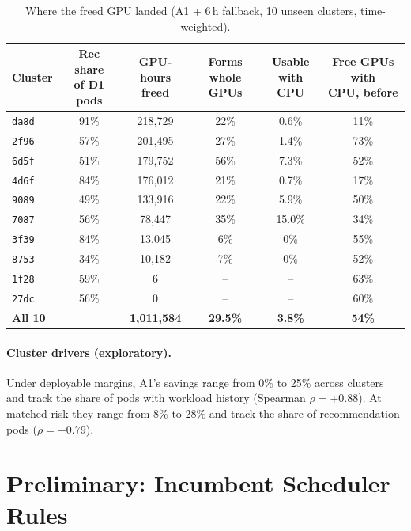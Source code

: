 \documentclass[10pt]{article}
\begin{document}
\begin{table}[H]
\centering\small
\caption{Where the freed GPU landed (A1 + 6\,h fallback, 10 unseen clusters, time-weighted).}
\label{tab:usable}
\begin{tabular}{@{}lccccc@{}}
\toprule
Cluster & \makecell{Rec share\\of D1 pods} & \makecell{GPU-hours\\freed} & \makecell{Forms\\whole GPUs} & \makecell{Usable\\with CPU} & \makecell{Free GPUs with\\CPU, before} \\
\midrule
\texttt{da8d} & 91\% & 218{,}729 & 22\% & 0.6\% & 11\% \\
\texttt{2f96} & 57\% & 201{,}495 & 27\% & 1.4\% & 73\% \\
\texttt{6d5f} & 51\% & 179{,}752 & 56\% & 7.3\% & 52\% \\
\texttt{4d6f} & 84\% & 176{,}012 & 21\% & 0.7\% & 17\% \\
\texttt{9089} & 49\% & 133{,}916 & 22\% & 5.9\% & 50\% \\
\texttt{7087} & 56\% & 78{,}447 & 35\% & 15.0\% & 34\% \\
\texttt{3f39} & 84\% & 13{,}045 & 6\% & 0\% & 55\% \\
\texttt{8753} & 34\% & 10{,}182 & 7\% & 0\% & 52\% \\
\texttt{1f28} & 59\% & 6 & -- & -- & 63\% \\
\texttt{27dc} & 56\% & 0 & -- & -- & 60\% \\
\midrule
\textbf{All 10} & & \textbf{1{,}011{,}584} & \textbf{29.5\%} & \textbf{3.8\%} & \textbf{54\%} \\
\bottomrule
\end{tabular}
\end{table}

\paragraph{Cluster drivers (exploratory).} Under deployable margins, A1's savings range from 0\% to 25\% across clusters and track the share of pods with workload history (Spearman $\rho = +0.88$). At matched risk they range from 8\% to 28\% and track the share of recommendation pods ($\rho = +0.79$).

\section{Preliminary: Incumbent Scheduler Rules}
\label{app:schedulers}
\end{document}

